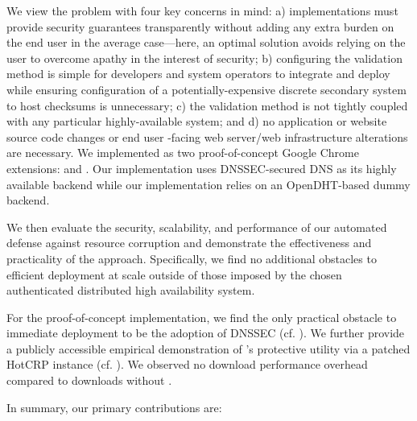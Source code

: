 We view the problem with four key concerns in mind: a) implementations must
provide security guarantees transparently without adding any extra burden on the
end user in the average case---here, an optimal solution avoids relying on the
user to overcome apathy in the interest of security; b) configuring the
validation method is simple for developers and system operators to integrate and
deploy while ensuring configuration of a potentially-expensive discrete
secondary system to host checksums is unnecessary; c) the validation method is
not tightly coupled with any particular highly-available system; and d) no
application or website source code changes or end user -facing web server/web
infrastructure alterations are necessary. We implemented \SYSTEM{} as two
proof-of-concept Google Chrome extensions: \DNSSYS{} and \DHTSYS{}. Our
\DNSSYS{} implementation uses DNSSEC-secured DNS as its highly available backend
while our \DHTSYS{} implementation relies on an OpenDHT-based dummy backend.

We then evaluate the security, scalability, and performance of our automated
defense against resource corruption and demonstrate the effectiveness and
practicality of the \SYSTEM{} approach. Specifically, we find no additional
obstacles to efficient deployment at scale outside of those imposed by the
chosen authenticated distributed high availability system.

For the proof-of-concept \DNSSYS{} implementation, we find the only practical
obstacle to immediate deployment to be the adoption of DNSSEC (cf.
). We further provide a publicly accessible empirical
demonstration of \DNSSYS{}'s protective utility via a patched HotCRP instance
(cf. ). We observed no download performance overhead
compared to downloads without \DNSSYS{}.

In summary, our primary contributions are:

